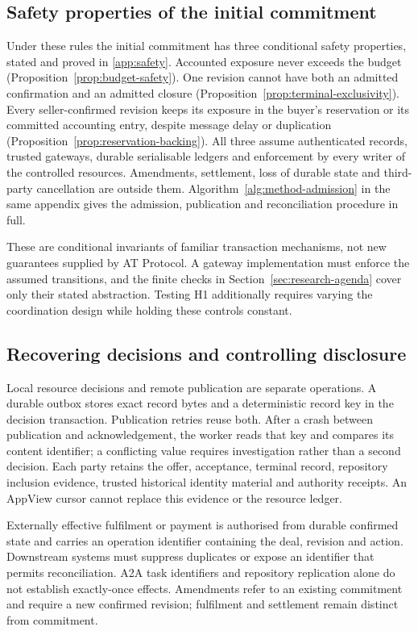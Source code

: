 \subsection{Safety properties of the initial commitment}

Under these rules the initial commitment has three conditional safety properties, stated and proved in \cref{app:safety}. Accounted exposure never exceeds the budget (Proposition~\ref{prop:budget-safety}). One revision cannot have both an admitted confirmation and an admitted closure (Proposition~\ref{prop:terminal-exclusivity}). Every seller-confirmed revision keeps its exposure in the buyer's reservation or its committed accounting entry, despite message delay or duplication (Proposition~\ref{prop:reservation-backing}). All three assume authenticated records, trusted gateways, durable serialisable ledgers and enforcement by every writer of the controlled resources. Amendments, settlement, loss of durable state and third-party cancellation are outside them. Algorithm~\ref{alg:method-admission} in the same appendix gives the admission, publication and reconciliation procedure in full.

These are conditional invariants of familiar transaction mechanisms, not new guarantees supplied by AT Protocol. A gateway implementation must enforce the assumed transitions, and the finite checks in Section~\ref{sec:research-agenda} cover only their stated abstraction. Testing H1 additionally requires varying the coordination design while holding these controls constant.

\subsection{Recovering decisions and controlling disclosure}

Local resource decisions and remote publication are separate operations. A durable outbox stores exact record bytes and a deterministic record key in the decision transaction. Publication retries reuse both. After a crash between publication and acknowledgement, the worker reads that key and compares its content identifier; a conflicting value requires investigation rather than a second decision. Each party retains the offer, acceptance, terminal record, repository inclusion evidence, trusted historical identity material and authority receipts. An AppView cursor cannot replace this evidence or the resource ledger.

Externally effective fulfilment or payment is authorised from durable confirmed state and carries an operation identifier containing the deal, revision and action. Downstream systems must suppress duplicates or expose an identifier that permits reconciliation. A2A task identifiers and repository replication alone do not establish exactly-once effects. Amendments refer to an existing commitment and require a new confirmed revision; fulfilment and settlement remain distinct from commitment.


